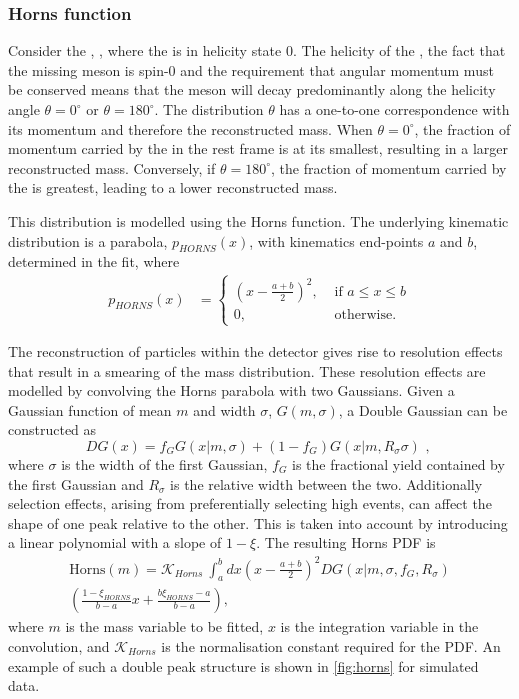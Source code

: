 \subsubsection{Horns function}

Consider the \decay{\Bm}{\Dstarz\Kstarm}, \decay{\Dstarz}{\Dz\piz}, where the \Dstarz is in helicity state 0. The helicity of the \Dstarz, the fact that the missing \piz meson is spin-0 and the requirement that angular momentum must be conserved means that the \piz meson will decay predominantly along the helicity angle $\theta = 0^{\circ}$ or $\theta = 180^{\circ}$. The distribution $\theta$ has a one-to-one correspondence with its momentum and therefore the reconstructed \Bm mass. When $\theta = 0^{\circ}$, the fraction of momentum carried by the \piz in the \Bm rest frame is at its smallest, resulting in a larger reconstructed \Bm mass. Conversely, if $\theta = 180^{\circ}$, the fraction of momentum carried by the \piz is greatest, leading to a lower reconstructed \Bm mass.

This distribution is modelled using the Horns function. The underlying kinematic distribution is a parabola, $p_{HORNS}(x)$, with kinematics end-points $a$ and $b$, determined in the fit, where
\begin{align}
p_{HORNS}(x) &= \begin{cases}
\left(x - \frac{a+b}{2}\right)^2, & \text{ if $a \leq x \leq b$}\\ 	
0, & \text{ otherwise.}
\end{cases} 
\end{align}

The reconstruction of particles within the \lhcb detector gives rise to resolution effects that result in a smearing of the mass distribution. These resolution effects are modelled by convolving the Horns parabola with two Gaussians. Given a Gaussian function of mean $m$ and width $\sigma$, $G(m,\sigma)$, a Double Gaussian can be constructed as
\begin{equation}
DG(x) = f_G G(x|m,\sigma) + \left(1-f_G\right) G(x|m,R_{\sigma}\sigma) \text{ , }
\end{equation}
where $\sigma$ is the width of the first Gaussian, $f_G$ is the fractional yield contained by the first Gaussian and $R_{\sigma}$ is the relative width between the two. Additionally selection effects, arising from preferentially selecting high \pt events, can affect the shape of one peak relative to the other. This is taken into account by introducing a linear polynomial with a slope of $1 - \xi$. The resulting Horns PDF is
\begin{multline}
\text{Horns}(m) = \mathcal{K}_{Horns}\ \int_a^b dx \left(x - \frac{a+b}{2}\right)^2 DG(x|m,\sigma,f_G,R_{\sigma}) \\
\left( \frac{1 - \xi_{HORNS}}{b - a}x + \frac{b\xi_{HORNS} - a}{b - a}\right),
\label{eqn:horns}
\end{multline}
where $m$ is the mass variable to be fitted, $x$ is the integration variable in the convolution, and $\mathcal{K}_{Horns}$ is the normalisation constant required for the PDF. An example of such a double peak structure is shown in \fig\ref{fig:horns} for simulated data.

